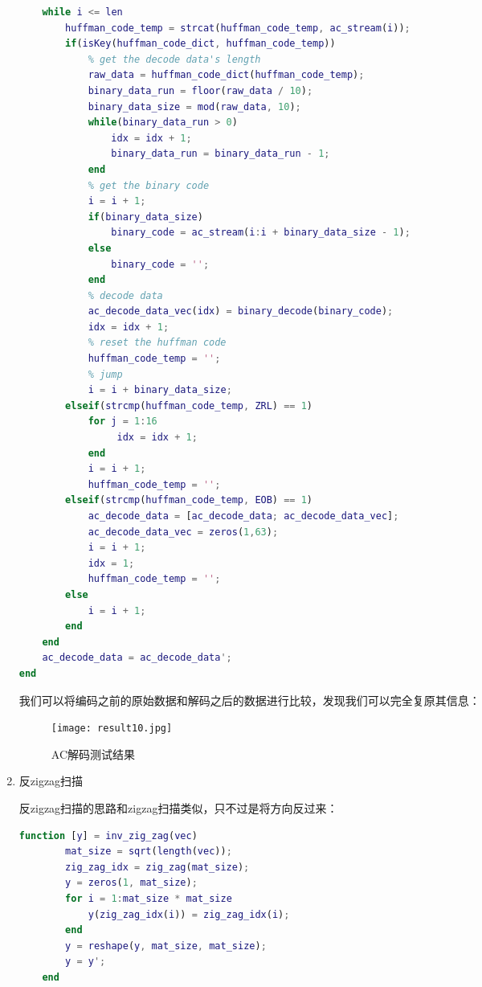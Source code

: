 \documentclass[a4paper]{article}
\begin{document}
\begin{enumerate}
\begin{lstlisting}[language=matlab, caption=ac decode]
    % diff decode
    while i <= len
        huffman_code_temp = strcat(huffman_code_temp, ac_stream(i));
        if(isKey(huffman_code_dict, huffman_code_temp))
            % get the decode data's length
            raw_data = huffman_code_dict(huffman_code_temp);
            binary_data_run = floor(raw_data / 10);
            binary_data_size = mod(raw_data, 10);
            while(binary_data_run > 0)
                idx = idx + 1;
                binary_data_run = binary_data_run - 1;
            end
            % get the binary code
            i = i + 1;
            if(binary_data_size)
                binary_code = ac_stream(i:i + binary_data_size - 1);
            else
                binary_code = '';
            end
            % decode data
            ac_decode_data_vec(idx) = binary_decode(binary_code);
            idx = idx + 1;
            % reset the huffman code
            huffman_code_temp = ''; 
            % jump
            i = i + binary_data_size;
        elseif(strcmp(huffman_code_temp, ZRL) == 1)
            for j = 1:16
                 idx = idx + 1;
            end
            i = i + 1;
            huffman_code_temp = '';
        elseif(strcmp(huffman_code_temp, EOB) == 1)
            ac_decode_data = [ac_decode_data; ac_decode_data_vec];
            ac_decode_data_vec = zeros(1,63);
            i = i + 1;
            idx = 1;
            huffman_code_temp = '';
        else
            i = i + 1;
        end
    end
    ac_decode_data = ac_decode_data';
end
    \end{lstlisting}
    
    \par 我们可以将编码之前的原始数据和解码之后的数据进行比较，发现我们可以完全复原其信息：
    \begin{figure}[ht]
        \centering
        \texttt{[image: result10.jpg]}
        \caption{AC解码测试结果}
        \label{fig:result 10}
    \end{figure}
    
    \item 反zigzag扫描
    \par 反zigzag扫描的思路和zigzag扫描类似，只不过是将方向反过来：
    \begin{lstlisting}[language=matlab, caption=inv zig zag]
    function [y] = inv_zig_zag(vec)
        mat_size = sqrt(length(vec));
        zig_zag_idx = zig_zag(mat_size);
        y = zeros(1, mat_size);
        for i = 1:mat_size * mat_size
            y(zig_zag_idx(i)) = zig_zag_idx(i);
        end
        y = reshape(y, mat_size, mat_size);
        y = y';
    end
    \end{lstlisting}
    

\end{enumerate}
\end{document}
